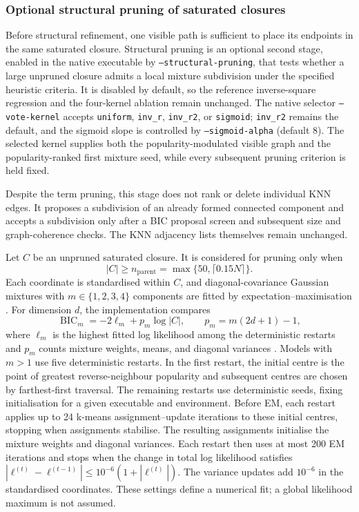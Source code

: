 \documentclass[pdflatex,sn-basic,Numbered]{sn-jnl}
\begin{document}
\subsubsection{Optional structural pruning of saturated closures}
\label{sec:structural_pruning}

Before structural refinement, one visible path is sufficient to place its
endpoints in the same saturated closure. Structural pruning is an optional second stage,
enabled in the native executable by \texttt{--structural-pruning}, that tests
whether a large unpruned closure admits a local mixture subdivision under
the specified heuristic criteria. It is disabled by default, so the reference inverse-square
regression and the four-kernel ablation remain unchanged. The native selector
\texttt{--vote-kernel} accepts \texttt{uniform}, \texttt{inv\_r},
\texttt{inv\_r2}, or \texttt{sigmoid}; \texttt{inv\_r2} remains the default,
and the sigmoid slope is controlled by \texttt{--sigmoid-alpha} (default $8$).
The selected kernel supplies both the popularity-modulated visible graph and
the popularity-ranked first mixture seed, while every subsequent pruning
criterion is held fixed.

Despite the term pruning, this stage does not rank or delete individual KNN
edges. It proposes a subdivision of an already formed connected component and
accepts a subdivision only after a BIC proposal screen and subsequent size
and graph-coherence checks. The KNN adjacency lists themselves remain unchanged.

Let $C$ be an unpruned saturated closure. It is considered for pruning only
when
\begin{equation}
|C|\geq n_{\mathrm{parent}}
=
\max\{50,\lceil0.15N\rceil\}.
\label{eq:pruning_parent_size}
\end{equation}
Each coordinate is standardised within $C$, and diagonal-covariance Gaussian
mixtures with $m\in\{1,2,3,4\}$ components are fitted by
expectation--maximisation \citep{DempsterLairdRubin1977}. For dimension $d$,
the implementation compares
\begin{equation}
\operatorname{BIC}_m
=
-2\ell_m+p_m\log |C|,
\qquad
p_m=m(2d+1)-1,
\label{eq:pruning_bic}
\end{equation}
where $\ell_m$ is the highest fitted log likelihood among the deterministic
restarts and $p_m$ counts mixture
weights, means, and diagonal variances \citep{Schwarz1978}. Models with
$m>1$ use five deterministic restarts. In the first restart, the initial
centre is the point of greatest reverse-neighbour popularity and subsequent
centres are chosen by farthest-first traversal. The remaining restarts use
deterministic seeds, fixing initialisation for a given executable and
environment. Before EM, each restart applies up to 24 k-means
assignment--update iterations to these initial centres, stopping when
assignments stabilise. The resulting assignments initialise the mixture
weights and diagonal variances. Each restart then
uses at most 200 EM iterations and stops when the change in total log
likelihood satisfies
$|\ell^{(t)}-\ell^{(t-1)}|\leq10^{-6}(1+|\ell^{(t)}|)$.
The variance updates add $10^{-6}$ in the standardised coordinates. These
settings define a numerical fit; a global likelihood maximum is not assumed.
\end{document}
